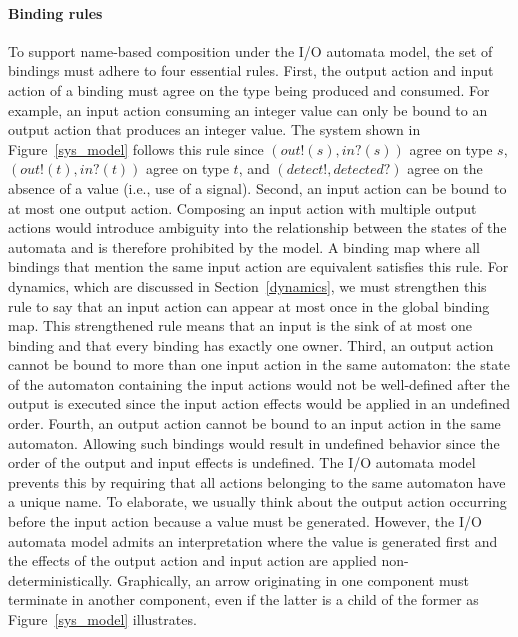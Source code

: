 \paragraph*{Binding rules}
To support name-based composition under the I/O automata model, the set of bindings must adhere to four essential rules.
First, the output action and input action of a binding must agree on the type being produced and consumed.
For example, an input action consuming an integer value can only be bound to an output action that produces an integer value.
The system shown in Figure~\ref{sys_model} follows this rule since $(out!(s), in?(s))$ agree on type $s$, $(out!(t), in?(t))$ agree on type $t$, and $(detect!, detected?)$ agree on the absence of a value (i.e., use of a signal).
Second, an input action can be bound to at most one output action.
Composing an input action with multiple output actions would introduce ambiguity into the relationship between the states of the automata and is therefore prohibited by the model.
A binding map where all bindings that mention the same input action are equivalent satisfies this rule.
For dynamics, which are discussed in Section~\ref{dynamics}, we must strengthen this rule to say that an input action can appear at most once in the global binding map.
This strengthened rule means that an input is the sink of at most one binding and that every binding has exactly one owner.
Third, an output action cannot be bound to more than one input action in the same automaton:  the state of the automaton containing the input actions would not be well-defined after the output is executed since the input action effects would be applied in an undefined order.
Fourth, an output action cannot be bound to an input action in the same automaton.
Allowing such bindings would result in undefined behavior since the order of the output and input effects is undefined.
The I/O automata model prevents this by requiring that all actions belonging to the same automaton have a unique name.
To elaborate, we usually think about the output action occurring before the input action because a value must be generated.
However, the I/O automata model admits an interpretation where the value is generated first and the effects of the output action and input action are applied non-deterministically.
Graphically, an arrow originating in one component must terminate in another component, even if the latter is a child of the former as Figure~\ref{sys_model} illustrates.

